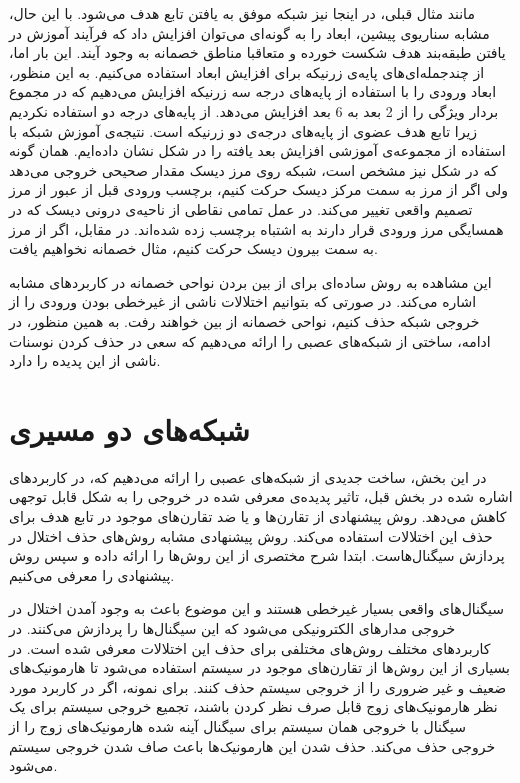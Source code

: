 \documentclass[12pt,onecolumn,a4paper]{article}
\begin{document}
مانند مثال قبلی، در اینجا نیز شبکه موفق به یافتن تابع هدف می‌شود. با این حال، مشابه سناریوی پیشین، ابعاد را به گونه‌ای می‌توان افزایش داد که فرآیند آموزش در یافتن طبقه‌بند هدف شکست خورده و متعاقبا مناطق خصمانه به وجود آیند. این بار اما، از چندجمله‌ای‌های پایه‌ی زرنیکه برای افزایش ابعاد استفاده می‌کنیم. به این منظور، ابعاد ورودی را با استفاده از پایه‌های درجه سه زرنیکه افزایش می‌دهیم که در مجموع بردار ویژگی را از 2 بعد به 6 بعد افزایش می‌دهد. از پایه‌های درجه دو استفاده نکردیم زیرا تابع هدف عضوی از پایه‌های درجه‌ی دو زرنیکه است. نتیجه‌ی آموزش شبکه با استفاده از مجموعه‌ی آموزشی افزایش بعد یافته را در شکل نشان داده‌ایم. همان گونه که در شکل نیز مشخص است، شبکه روی مرز دیسک مقدار صحیحی خروجی می‌دهد ولی اگر از مرز به سمت مرکز دیسک حرکت کنیم، برچسب ورودی قبل از عبور از مرز تصمیم واقعی تغییر می‌کند. در عمل تمامی نقاطی از ناحیه‌ی درونی دیسک که در همسایگی مرز ورودی قرار دارند به اشتباه برچسب زده شده‌اند. در مقابل، اگر از مرز به سمت بیرون دیسک حرکت کنیم، مثال خصمانه نخواهیم یافت.

این مشاهده به روش ساده‌ای برای از بین بردن نواحی خصمانه در کاربردهای مشابه اشاره می‌کند. در صورتی که بتوانیم اختلالات ناشی از غیرخطی بودن ورودی را از خروجی شبکه حذف کنیم، نواحی خصمانه از بین خواهند رفت. به همین منظور، در ادامه، ساختی از شبکه‌های عصبی را ارائه می‌دهیم که سعی در حذف کردن نوسنات ناشی از این پدیده را دارد.

\section{شبکه‌های دو مسیری}
در این بخش، ساخت جدیدی از شبکه‌های عصبی را ارائه می‌دهیم که، در کاربردهای اشاره شده در بخش قبل، تاثیر پدیده‌ی معرفی شده در خروجی را به شکل قابل توجهی کاهش می‌دهد. روش پیشنهادی از تقارن‌ها و یا ضد تقارن‌های موجود در تابع هدف برای حذف این اختلالات استفاده می‌کند. روش پیشنهادی مشابه روش‌های حذف اختلال 
در پردازش سیگنال‌هاست. ابتدا شرح مختصری از این روش‌ها را ارائه داده و سپس روش پیشنهادی را معرفی می‌کنیم.

سیگنال‌های واقعی بسیار غیرخطی هستند و این موضوع باعث به وجود آمدن اختلال در خروجی مدارهای الکترونیکی می‌شود که این سیگنا‌ل‌ها را پردازش می‌کنند. در کاربردهای مختلف روش‌های مختلفی برای حذف این اختلالات معرفی شده است. در بسیاری از این روش‌ها از تقارن‌های موجود در سیستم استفاده می‌شود تا هارمونیک‌های ضعیف و غیر ضروری را از خروجی سیستم حذف کنند. برای نمونه، اگر در کاربرد مورد نظر هارمونیک‌های زوج قابل صرف نظر کردن باشند، تجمیع خروجی سیستم برای یک سیگنال با خروجی همان سیستم برای سیگنال آینه شده هارمونیک‌های زوج را از خروجی حذف می‌کند. حذف شدن این هارمونیک‌ها باعث صاف شدن خروجی سیستم می‌شود.
\end{document}
